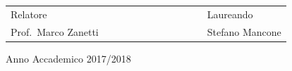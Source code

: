 \begin{titlepage}
\begin{addmargin}[-1cm]{-3cm}
  \vspace{12mm}
  \begin{spacing}{2}
   \begin{tabular}{ l  c  c c c  cc c c c c  l }
    {\Large{ Relatore}}             &  &  &  &  &  &  &  &  &  &  & {\Large{ Laureando}}       \\
    {\Large{ Prof.\ Marco Zanetti}} &  &  &  &  &  &  &  &  &  &  & {\Large{ Stefano Mancone}} \\
   \end{tabular}
  \end{spacing}
  \vspace{12 mm}
  
  \begin{center}
   {\Large{ Anno Accademico 2017/2018}}
   
  \end{center}
 \end{addmargin}
\end{titlepage}

